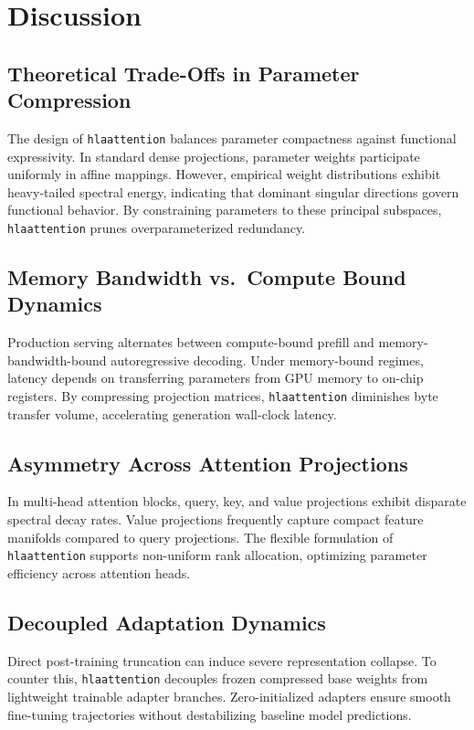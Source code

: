 \section{Discussion}

\subsection{Theoretical Trade-Offs in Parameter Compression}
The design of \texttt{hlaattention} balances parameter compactness against functional expressivity. In standard dense projections, parameter weights participate uniformly in affine mappings. However, empirical weight distributions exhibit heavy-tailed spectral energy, indicating that dominant singular directions govern functional behavior. By constraining parameters to these principal subspaces, \texttt{hlaattention} prunes overparameterized redundancy.

\subsection{Memory Bandwidth vs.\ Compute Bound Dynamics}
Production serving alternates between compute-bound prefill and memory-bandwidth-bound autoregressive decoding. Under memory-bound regimes, latency depends on transferring parameters from GPU memory to on-chip registers. By compressing projection matrices, \texttt{hlaattention} diminishes byte transfer volume, accelerating generation wall-clock latency.

\subsection{Asymmetry Across Attention Projections}
In multi-head attention blocks, query, key, and value projections exhibit disparate spectral decay rates. Value projections frequently capture compact feature manifolds compared to query projections. The flexible formulation of \texttt{hlaattention} supports non-uniform rank allocation, optimizing parameter efficiency across attention heads.

\subsection{Decoupled Adaptation Dynamics}
Direct post-training truncation can induce severe representation collapse. To counter this, \texttt{hlaattention} decouples frozen compressed base weights from lightweight trainable adapter branches. Zero-initialized adapters ensure smooth fine-tuning trajectories without destabilizing baseline model predictions.

